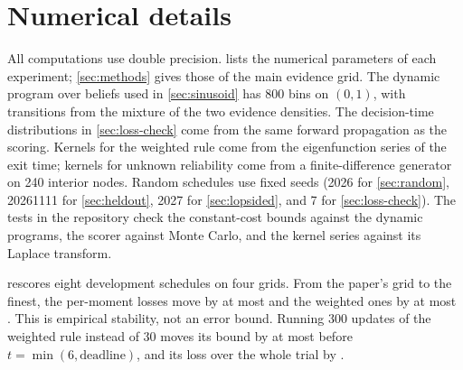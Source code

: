 \documentclass[11pt]{article}
\theoremstyle{definition}
\theoremstyle{remark}
\begin{document}
\section{Numerical details}
\label{app:numerics}

All computations use double precision.  lists the numerical parameters of each
experiment; \cref{sec:methods} gives those of the main evidence grid. The dynamic program over
beliefs used in \cref{sec:sinusoid} has 800 bins on $(0, 1)$, with transitions from the mixture of
the two evidence densities. The decision-time distributions in \cref{sec:loss-check} come from the
same forward propagation as the scoring. Kernels for the weighted rule come from the eigenfunction
series of the exit time; kernels for unknown reliability come from a finite-difference generator
on 240 interior nodes. Random schedules use fixed seeds (2026 for \cref{sec:random}, 20261111 for
\cref{sec:heldout}, 2027 for \cref{sec:lopsided}, and 7 for \cref{sec:loss-check}). The tests in the
repository check the constant-cost bounds against the dynamic programs, the scorer against Monte Carlo,
and the kernel series against its Laplace transform.

 rescores eight development schedules on four grids. From the paper's grid to the
finest, the per-moment losses move by at most \GridPmMaxChange{} and the weighted ones by at most
\GridWbMaxChange. This is empirical stability, not an error bound. Running 300 updates of the
weighted rule instead of 30 moves its bound by at most \FixedPointMove{} before
$t = \min(6, \text{deadline})$, and its loss over the whole trial by \FixedPointLossChange.
\end{document}
